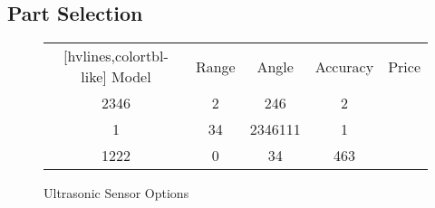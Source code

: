 \subsection{Part Selection}

\begin{figure}[h]
	\centering
	\setlength{\tabcolsep}{11pt} %
	\renewcommand{\arraystretch}{2} %
	\begin{NiceTabular}{ccccc}[hvlines,colortbl-like]
		\CodeBefore
		\columncolor{}{}
		\Body
		Model & Range & Angle & Accuracy & Price\\
		2346 & 2 & 246  & 2 & \\
		1 & 34 & 2346111 & 1 & \\
		1222 & 0 & 34 & 463
	\end{NiceTabular}
	\caption{\label{fig:compareUltrasonic}Ultrasonic Sensor Options}
\end{figure}